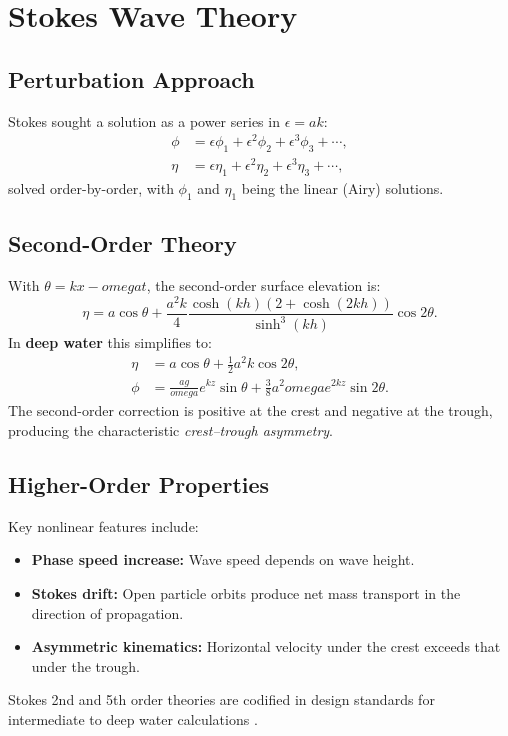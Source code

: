 \documentclass[journal,10pt,twocolumn]{IEEEtran}
\def\omega{omega}%
\begin{document}
\section{Stokes Wave Theory}
\label{sec:stokes}

\subsection{Perturbation Approach}
Stokes sought a solution as a power series in $\epsilon=ak$:
\begin{align}
  \phi &= \epsilon\phi_1 + \epsilon^2\phi_2 + \epsilon^3\phi_3 + \cdots, \\
  \eta &= \epsilon\eta_1 + \epsilon^2\eta_2 + \epsilon^3\eta_3 + \cdots,
\end{align}
solved order-by-order, with $\phi_1$ and $\eta_1$ being the linear (Airy) solutions.

\subsection{Second-Order Theory}
With $\theta=kx-\omega t$, the second-order surface elevation is:
\begin{equation}
  \eta = a\cos\theta
    + \frac{a^2k}{4}\frac{\cosh(kh)(2+\cosh(2kh))}{\sinh^3(kh)}\cos 2\theta.
\end{equation}
In \textbf{deep water} this simplifies to:
\begin{align}
  \eta &= a\cos\theta + \tfrac{1}{2}a^2k\cos 2\theta, \\
  \phi &= \frac{ag}{\omega}e^{kz}\sin\theta
         + \frac{3}{8}a^2\omega e^{2kz}\sin 2\theta.
\end{align}
The second-order correction is positive at the crest and negative at the trough,
producing the characteristic \emph{crest--trough asymmetry}.

\subsection{Higher-Order Properties}
Key nonlinear features include:
\begin{itemize}
  \item \textbf{Phase speed increase:} Wave speed depends on wave height.
  \item \textbf{Stokes drift:} Open particle orbits produce net mass transport in the
    direction of propagation.
  \item \textbf{Asymmetric kinematics:} Horizontal velocity under the crest exceeds
    that under the trough.
\end{itemize}
Stokes 2nd and 5th order theories are codified in design standards for intermediate to
deep water calculations \cite{DNVC205}.
\end{document}
